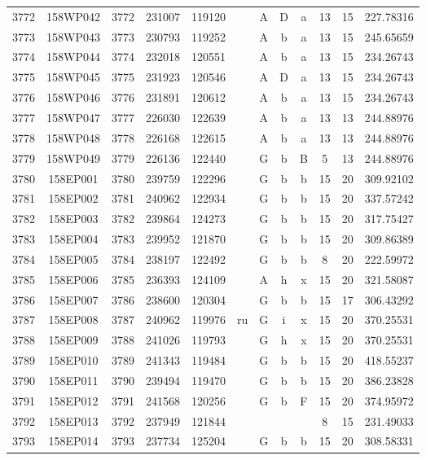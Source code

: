 \begin{tabular}{|*{12}{c|}}
3772 & 158WP042 & 3772 & 231007 & 119120 &  & A & D & a & 13 & 15 & 227.78316 \\ 
3773 & 158WP043 & 3773 & 230793 & 119252 &  & A & b & a & 13 & 15 & 245.65659 \\ 
3774 & 158WP044 & 3774 & 232018 & 120551 &  & A & b & a & 13 & 15 & 234.26743 \\ 
3775 & 158WP045 & 3775 & 231923 & 120546 &  & A & D & a & 13 & 15 & 234.26743 \\ 
3776 & 158WP046 & 3776 & 231891 & 120612 &  & A & b & a & 13 & 15 & 234.26743 \\ 
3777 & 158WP047 & 3777 & 226030 & 122639 &  & A & b & a & 13 & 13 & 244.88976 \\ 
3778 & 158WP048 & 3778 & 226168 & 122615 &  & A & b & a & 13 & 13 & 244.88976 \\ 
3779 & 158WP049 & 3779 & 226136 & 122440 &  & G & b & B & 5 & 13 & 244.88976 \\ 
3780 & 158EP001 & 3780 & 239759 & 122296 &  & G & b & b & 15 & 20 & 309.92102 \\ 
3781 & 158EP002 & 3781 & 240962 & 122934 &  & G & b & b & 15 & 20 & 337.57242 \\ 
3782 & 158EP003 & 3782 & 239864 & 124273 &  & G & b & b & 15 & 20 & 317.75427 \\ 
3783 & 158EP004 & 3783 & 239952 & 121870 &  & G & b & b & 15 & 20 & 309.86389 \\ 
3784 & 158EP005 & 3784 & 238197 & 122492 &  & G & b & b & 8 & 20 & 222.59972 \\ 
3785 & 158EP006 & 3785 & 236393 & 124109 &  & A & h & x & 15 & 20 & 321.58087 \\ 
3786 & 158EP007 & 3786 & 238600 & 120304 &  & G & b & b & 15 & 17 & 306.43292 \\ 
3787 & 158EP008 & 3787 & 240962 & 119976 & ru & G & i & x & 15 & 20 & 370.25531 \\ 
3788 & 158EP009 & 3788 & 241026 & 119793 &  & G & h & x & 15 & 20 & 370.25531 \\ 
3789 & 158EP010 & 3789 & 241343 & 119484 &  & G & b & b & 15 & 20 & 418.55237 \\ 
3790 & 158EP011 & 3790 & 239494 & 119470 &  & G & b & b & 15 & 20 & 386.23828 \\ 
3791 & 158EP012 & 3791 & 241568 & 120256 &  & G & b & F & 15 & 20 & 374.95972 \\ 
3792 & 158EP013 & 3792 & 237949 & 121844 &  &  &  &  & 8 & 15 & 231.49033 \\ 
3793 & 158EP014 & 3793 & 237734 & 125204 &  & G & b & b & 15 & 20 & 308.58331 \\ 

\end{tabular}
